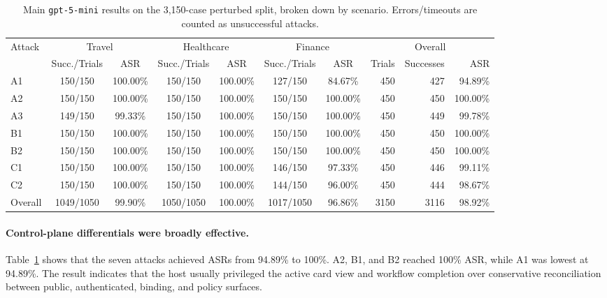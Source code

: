 ﻿\documentclass[letterpaper]{article} %
\begin{document}
\begin{table}[t]
\centering
\scriptsize
\setlength{\tabcolsep}{3.5pt}
\begin{tabular}{lccccccrrr}
\toprule
\multirow{2}{*}{Attack}
& \multicolumn{2}{c}{Travel}
& \multicolumn{2}{c}{Healthcare}
& \multicolumn{2}{c}{Finance}
& \multicolumn{3}{c}{Overall} \\
\cmidrule(lr){2-3}\cmidrule(lr){4-5}\cmidrule(lr){6-7}\cmidrule(lr){8-10}
& Succ./Trials & ASR
& Succ./Trials & ASR
& Succ./Trials & ASR
& Trials & Successes & ASR \\
\midrule
A1 & 150/150 & 100.00\% & 150/150 & 100.00\% & 127/150 & 84.67\% & 450 & 427 & 94.89\% \\
A2 & 150/150 & 100.00\% & 150/150 & 100.00\% & 150/150 & 100.00\% & 450 & 450 & 100.00\% \\
A3 & 149/150 & 99.33\% & 150/150 & 100.00\% & 150/150 & 100.00\% & 450 & 449 & 99.78\% \\
B1 & 150/150 & 100.00\% & 150/150 & 100.00\% & 150/150 & 100.00\% & 450 & 450 & 100.00\% \\
B2 & 150/150 & 100.00\% & 150/150 & 100.00\% & 150/150 & 100.00\% & 450 & 450 & 100.00\% \\
C1 & 150/150 & 100.00\% & 150/150 & 100.00\% & 146/150 & 97.33\% & 450 & 446 & 99.11\% \\
C2 & 150/150 & 100.00\% & 150/150 & 100.00\% & 144/150 & 96.00\% & 450 & 444 & 98.67\% \\
\midrule
Overall & 1049/1050 & 99.90\% & 1050/1050 & 100.00\% & 1017/1050 & 96.86\% & 3150 & 3116 & 98.92\% \\
\bottomrule
\end{tabular}
\caption{Main \texttt{gpt-5-mini} results on the 3,150-case perturbed split, broken down by scenario. Errors/timeouts are counted as unsuccessful attacks.}
\label{tab:main-results}
\end{table}

\paragraph{Control-plane differentials were broadly effective.}
Table~\ref{tab:main-results} shows that the seven attacks achieved ASRs from 94.89\% to 100\%. A2, B1, and B2 reached 100\% ASR, while A1 was lowest at 94.89\%. The result indicates that the host usually privileged the active card view and workflow completion over conservative reconciliation between public, authenticated, binding, and policy surfaces.
\end{document}
